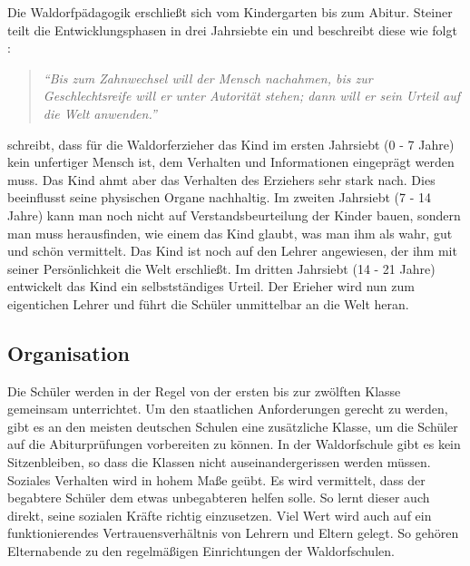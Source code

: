 
Die Waldorfpädagogik erschließt sich vom Kindergarten bis zum Abitur. Steiner teilt die Entwicklungsphasen in drei Jahrsiebte ein und beschreibt diese wie folgt \citep[S. 139]{steiner10}:

\begin{quotation}
			\emph{\enquote{Bis zum Zahnwechsel will der Mensch nachahmen, bis zur Geschlechtsreife will er unter Autorität stehen; dann will er sein Urteil auf die Welt anwenden.}}
\end{quotation}

\citet{kiersch07} schreibt, dass für die Waldorferzieher das Kind im ersten Jahrsiebt (0 - 7 Jahre) kein unfertiger Mensch ist, dem Verhalten und Informationen eingeprägt werden muss. Das Kind ahmt aber das Verhalten des Erziehers sehr stark nach. Dies beeinflusst seine physischen Organe nachhaltig. Im zweiten Jahrsiebt (7 - 14 Jahre) kann man noch nicht auf Verstandsbeurteilung der Kinder bauen, sondern man muss herausfinden, wie einem das Kind glaubt, was man ihm als wahr, gut und schön vermittelt. Das Kind ist noch auf den Lehrer angewiesen, der ihm mit seiner Persönlichkeit die Welt erschließt. Im dritten Jahrsiebt (14 - 21 Jahre) entwickelt das Kind ein selbstständiges Urteil. Der Erieher wird nun zum eigentichen Lehrer und führt die Schüler unmittelbar an die Welt heran. 

\subsection{Organisation} %
\label{sub:organisation}


Die Schüler werden in der Regel von der ersten bis zur zwölften Klasse gemeinsam unterrichtet. Um den staatlichen Anforderungen gerecht zu werden, gibt es an den meisten deutschen Schulen eine zusätzliche Klasse, um die Schüler auf die Abiturprüfungen vorbereiten zu können. In der Waldorfschule gibt es kein Sitzenbleiben, so dass die Klassen nicht auseinandergerissen werden müssen. Soziales Verhalten wird in hohem Maße geübt. Es wird vermittelt, dass der begabtere Schüler dem etwas unbegabteren helfen solle. So lernt dieser auch direkt, seine sozialen Kräfte richtig einzusetzen. Viel Wert wird auch auf ein funktionierendes Vertrauensverhältnis von Lehrern und Eltern gelegt. So gehören Elternabende zu den regelmäßigen Einrichtungen der Waldorfschulen. \citep[Vgl.][]{kiersch07, hemleben63}


